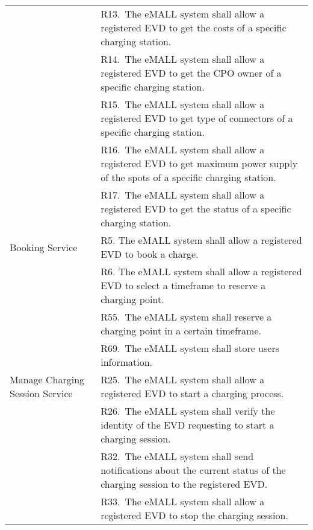 \begin{center}
\begin{longtable}{p{0.3\linewidth}p{0.7\linewidth}}
        & R13.\ The eMALL system shall allow a registered EVD to get the costs of a specific charging station.                                            \\
        & R14.\ The eMALL system shall allow a registered EVD to get the CPO owner of a specific charging station.                                        \\
        & R15.\ The eMALL system shall allow a registered EVD to get type of connectors of a specific charging station.                                   \\
        & R16.\ The eMALL system shall allow a registered EVD to get maximum power supply of the spots of a specific charging station.                    \\
        & R17.\ The eMALL system shall allow a registered EVD to get the status of a specific charging station.                                           \\
        \hline
        Booking Service                        & R5. The eMALL system shall allow a registered EVD to book a charge.                                                                             \\
        & R6. The eMALL system shall allow a registered EVD to select a timeframe to reserve a charging point.                                            \\
        & R55.\ The eMALL system shall reserve a charging point in a certain timeframe.                                                                   \\
        & R69.\ The eMALL system shall store users information.                                                                                           \\
        \hline
        Manage Charging Session Service        & R25.\ The eMALL system shall allow a registered EVD to start a charging process.                                                                \\
        & R26.\ The eMALL system shall verify the identity of the EVD requesting to start a charging session.                                             \\
        & R32.\ The eMALL system shall send notifications about the current status of the charging session to the registered EVD.                         \\
        & R33.\ The eMALL system shall allow a registered EVD to stop the charging session.                                                               \\

\end{longtable}
\end{center}
